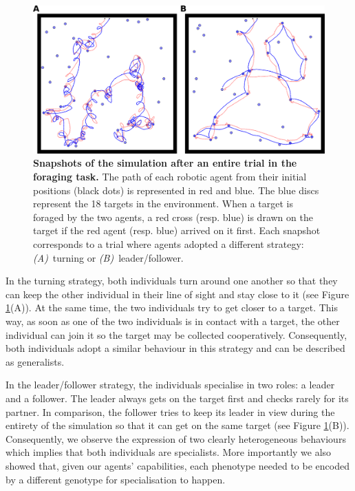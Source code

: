   \begin{figure}[ht]
    \centerfloat
      \includegraphics[scale=0.7]{fig/ArticleRob2/figBehaviours.png}
    \caption{\textbf{Snapshots of the simulation after an entire trial in the foraging task.} The path of each robotic agent from their initial positions (black dots) is represented in red and blue. The blue discs represent the 18 targets in the environment. When a target is foraged by the two agents, a red cross (resp. blue) is drawn on the target if the red agent (resp. blue) arrived on it first. Each snapshot corresponds to a trial where agents adopted a different strategy: {\em (A)}~turning or {\em (B)}~leader/follower.}
    \label{fig:behaviorTraces}
  \end{figure}

  In the turning strategy, both individuals turn around one another so that they can keep the other individual in their line of sight and stay close to it (see Figure \ref{fig:behaviorTraces}(A)). At the same time, the two individuals try to get closer to a target. This way, as soon as one of the two individuals is in contact with a target, the other individual can join it so the target may be collected cooperatively. Consequently, both individuals adopt a similar behaviour in this strategy and can be described as generalists.

  In the leader/follower strategy, the individuals specialise in two roles: a leader and a follower. The leader always gets on the target first and checks rarely for its partner. In comparison, the follower tries to keep its leader in view during the entirety of the simulation so that it can get on the same target (see Figure \ref{fig:behaviorTraces}(B)). Consequently, we observe the expression of two clearly heterogeneous behaviours which implies that both individuals are specialists. More importantly we also showed that, given our agents' capabilities, each phenotype needed to be encoded by a different genotype for specialisation to happen.

